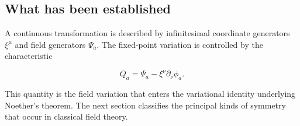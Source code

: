 \subsection{What has been established}

A continuous transformation is described by infinitesimal coordinate generators \(\xi^{\mu}\) and field generators \(\Psi_a\). The fixed-point variation is controlled by the characteristic

\[
Q_a
=
\Psi_a-\xi^{\nu}\partial_{\nu}\phi_a.
\]

This quantity is the field variation that enters the variational identity underlying Noether's theorem. The next section classifies the principal kinds of symmetry that occur in classical field theory.
